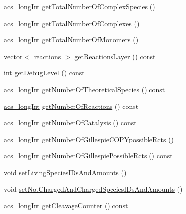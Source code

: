\begin{DoxyCompactItemize}
\item 
\hyperlink{a00050_a19319d75f02db4308bc5c0026d98cd85}{acs\+\_\+long\+Int} \hyperlink{a00013_a453d88017912e8b5973310ea2b044266}{get\+Total\+Number\+Of\+Complex\+Species} ()
\item 
\hyperlink{a00050_a19319d75f02db4308bc5c0026d98cd85}{acs\+\_\+long\+Int} \hyperlink{a00013_ab564c7ddffd3dba896d5b049e1257793}{get\+Total\+Number\+Of\+Complexes} ()
\item 
\hyperlink{a00050_a19319d75f02db4308bc5c0026d98cd85}{acs\+\_\+long\+Int} \hyperlink{a00013_aa8c94019533639038f99587fc2b029dc}{get\+Total\+Number\+Of\+Monomers} ()
\item 
vector$<$ \hyperlink{a00020}{reactions} $>$ \hyperlink{a00013_a3d44f3f4a8f9010fa99c49f5cc961416}{get\+Reactions\+Layer} () const 
\item 
int \hyperlink{a00013_a2de42381b0b9cba889bbb95c1456cfe5}{get\+Debug\+Level} () const 
\item 
\hyperlink{a00050_a19319d75f02db4308bc5c0026d98cd85}{acs\+\_\+long\+Int} \hyperlink{a00013_ab98d4ad28b101f08279aa3458d5dfda3}{get\+Number\+Of\+Theoretical\+Species} () const 
\item 
\hyperlink{a00050_a19319d75f02db4308bc5c0026d98cd85}{acs\+\_\+long\+Int} \hyperlink{a00013_abf45b6406f8c0e95c4c5edf6b374e112}{get\+Number\+Of\+Reactions} () const 
\item 
\hyperlink{a00050_a19319d75f02db4308bc5c0026d98cd85}{acs\+\_\+long\+Int} \hyperlink{a00013_a21609adb1a83a4cb7eaec78a90acd624}{get\+Number\+Of\+Catalysis} () const 
\item 
\hyperlink{a00050_a19319d75f02db4308bc5c0026d98cd85}{acs\+\_\+long\+Int} \hyperlink{a00013_a61d3f0644f40fb68be59bff6fad5176e}{get\+Number\+Of\+Gillespie\+C\+O\+P\+Ypossible\+Rcts} ()
\item 
\hyperlink{a00050_a19319d75f02db4308bc5c0026d98cd85}{acs\+\_\+long\+Int} \hyperlink{a00013_a3140242018e8232dfa89a127ac1bb282}{get\+Number\+Of\+Gillespie\+Possible\+Rcts} () const 
\item 
void \hyperlink{a00013_a4fb98d7cad06ef479e2643785231feb9}{set\+Living\+Species\+I\+Ds\+And\+Amounts} ()
\item 
void \hyperlink{a00013_ac5528a39937cdc76f0dd23c27542110c}{set\+Not\+Charged\+And\+Charged\+Species\+I\+Ds\+And\+Amounts} ()
\item 
\hyperlink{a00050_a19319d75f02db4308bc5c0026d98cd85}{acs\+\_\+long\+Int} \hyperlink{a00013_a8b9a3b5c5a2f86206c5fb124352e366e}{get\+Cleavage\+Counter} () const 
\item 

\end{DoxyCompactItemize}
